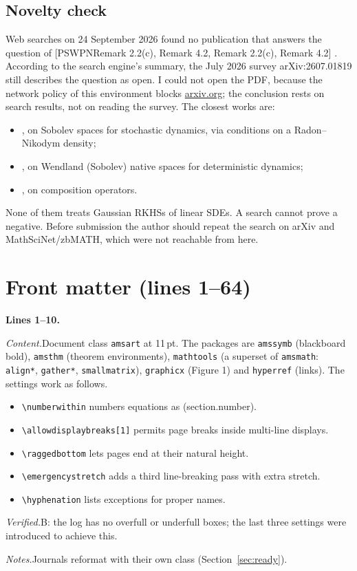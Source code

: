 \documentclass[11pt]{amsart}
\newcommand{\src}[1]{\par\bigskip\noindent\textbf{Lines #1.}\enspace}
\newcommand{\content}{\par\smallskip\noindent\textit{Content.}\enspace}
\newcommand{\verified}{\par\smallskip\noindent\textit{Verified.}\enspace}
\newcommand{\notes}{\par\smallskip\noindent\textit{Notes.}\enspace}
\newcommand{\tB}{\textsf{B}}
\newcommand{\PS}[1][]{[PSWPN\ifx\relax#1\relax\else, #1\fi]}
\begin{document}
\subsection{Novelty check}\label{sec:novelty}
Web searches on 24 September 2026 found no publication that answers the question of \PS[Remark 2.2(c), Remark 4.2]
\cite{src-survey,src-hertel}. According to the search engine's summary, the July 2026 survey arXiv:2607.01819 still
describes the question as open. I could not open the PDF, because the network policy of this environment blocks
\url{arxiv.org}; the conclusion rests on search results, not on reading the survey. The closest works are:
\begin{itemize}
\item \cite{Hertel}, on Sobolev spaces for stochastic dynamics, via conditions on a Radon--Nikodym density;
\item \cite{Koehne}, on Wendland (Sobolev) native spaces for deterministic dynamics;
\item \cite{IIS}, on composition operators.
\end{itemize}
None of them treats Gaussian RKHSs of linear SDEs. A search cannot prove a negative. Before submission the author
should repeat the search on arXiv and MathSciNet/zbMATH, which were not reachable from here.

\section{Front matter (lines 1--64)}\label{sec:front}

\src{1--10}
\content Document class \texttt{amsart} at 11\,pt. The packages are \texttt{amssymb} (blackboard bold),
\texttt{amsthm} (theorem environments), \texttt{mathtools} (a superset of \texttt{amsmath}: \texttt{align*},
\texttt{gather*}, \texttt{smallmatrix}), \texttt{graphicx} (Figure 1) and \texttt{hyperref} (links). The settings
work as follows.
\begin{itemize}
\item \verb|\numberwithin| numbers equations as (section.number).
\item \verb|\allowdisplaybreaks[1]| permits page breaks inside multi-line displays.
\item \verb|\raggedbottom| lets pages end at their natural height.
\item \verb|\emergencystretch| adds a third line-breaking pass with extra stretch.
\item \verb|\hyphenation| lists exceptions for proper names.
\end{itemize}
\verified \tB: the log has no overfull or underfull boxes; the last three settings were introduced to achieve this.
\notes Journals reformat with their own class (Section~\ref{sec:ready}).
\end{document}
